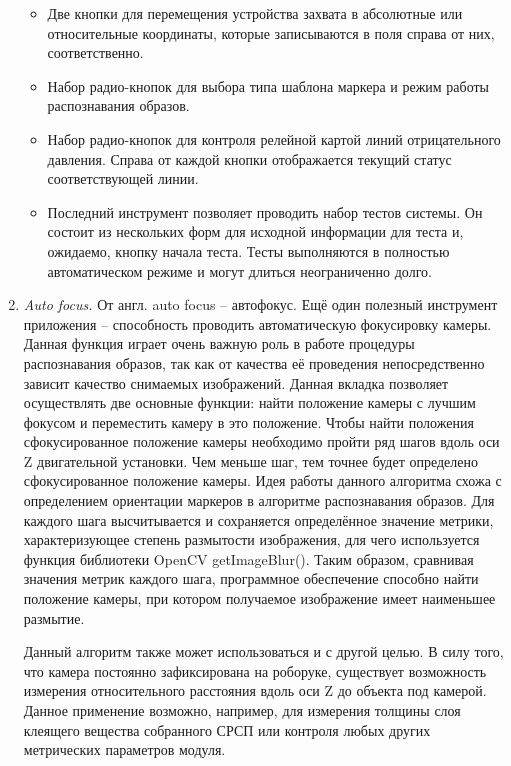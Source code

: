 \begin{enumerate}
\begin{itemize}
\setlength\itemsep{-0.5em}
\item Две кнопки для перемещения устройства захвата в абсолютные или относительные координаты, которые записываются в поля справа от них, соответственно.
\item Набор радио-кнопок для выбора типа шаблона маркера и режим работы распознавания образов.
\item Набор радио-кнопок для контроля релейной картой линий отрицательного давления. Справа от каждой кнопки отображается текущий статус соответствующей линии.
\item Последний инструмент позволяет проводить набор тестов системы. Он состоит из нескольких форм для исходной информации для теста и, ожидаемо, кнопку начала теста. Тесты выполняются в полностью автоматическом режиме и могут длиться неограниченно долго.
\end{itemize}

\item \emph{Auto focus.} От англ. auto focus -- автофокус. Ещё один полезный инструмент приложения -- способность проводить автоматическую фокусировку камеры. Данная функция играет очень важную роль в работе процедуры распознавания образов, так как от качества её проведения непосредственно зависит качество снимаемых изображений. Данная вкладка позволяет осуществлять две основные функции: найти положение камеры с лучшим фокусом и переместить камеру в это положение. Чтобы найти положения сфокусированное положение камеры необходимо пройти ряд шагов вдоль оси Z двигательной установки. Чем меньше шаг, тем точнее будет определено сфокусированное положение камеры. Идея работы данного алгоритма схожа с определением ориентации маркеров в алгоритме распознавания образов. Для каждого шага высчитывается и сохраняется определённое значение метрики, характеризующее степень размытости изображения, для чего используется функция библиотеки OpenCV getImageBlur(). Таким образом, сравнивая значения метрик каждого шага, программное обеспечение способно найти положение камеры, при котором получаемое изображение имеет наименьшее размытие.

Данный алгоритм также может использоваться и с другой целью. В силу того, что камера постоянно зафиксирована на роборуке, существует возможность измерения относительного расстояния вдоль оси Z до объекта под камерой. Данное применение возможно, например, для измерения толщины слоя клеящего вещества собранного СРСП или контроля любых других метрических параметров модуля.


\end{enumerate}
